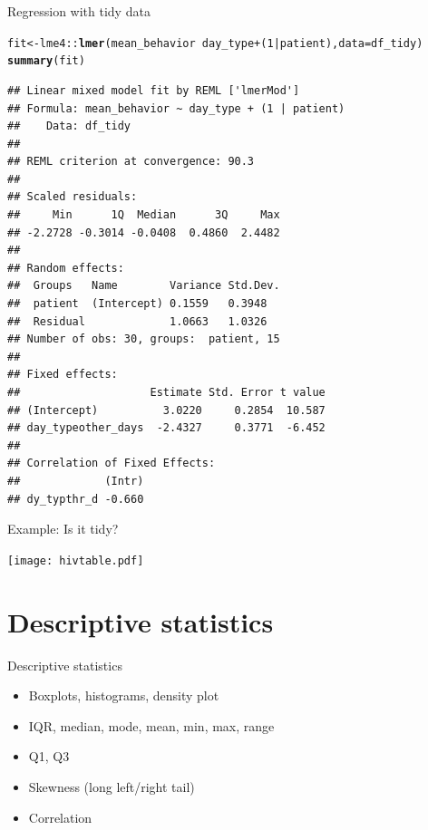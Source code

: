\documentclass[10pt,handout]{beamer}\usepackage[]{graphicx}\usepackage[]{color}
\makeatletter
\newcommand{\hlnum}[1]{\textcolor[rgb]{0.686,0.059,0.569}{#1}}%
\newcommand{\hlopt}[1]{\textcolor[rgb]{0,0,0}{#1}}%
\newcommand{\hlstd}[1]{\textcolor[rgb]{0.345,0.345,0.345}{#1}}%
\newcommand{\hlkwb}[1]{\textcolor[rgb]{0.69,0.353,0.396}{#1}}%
\newcommand{\hlkwc}[1]{\textcolor[rgb]{0.333,0.667,0.333}{#1}}%
\newcommand{\hlkwd}[1]{\textcolor[rgb]{0.737,0.353,0.396}{\textbf{#1}}}%
\newenvironment{kframe}{%
 \def\at@end@of@kframe{}%
 \ifinner\ifhmode%
  \def\at@end@of@kframe{\end{minipage}}%
  \begin{minipage}{\columnwidth}%
 \fi\fi%
 \def\FrameCommand##1{\hskip\@totalleftmargin \hskip-\fboxsep
 \colorbox{shadecolor}{##1}\hskip-\fboxsep
     \hskip-\linewidth \hskip-\@totalleftmargin \hskip\columnwidth}%
 \MakeFramed {\advance\hsize-\width
   \@totalleftmargin\z@ \linewidth\hsize
   \@setminipage}}%
 {\par\unskip\endMakeFramed%
 \at@end@of@kframe}
\newenvironment{knitrout}{}{} %
\makeatother
\begin{document}
\begin{frame}[fragile]{Regression with tidy data}
	
	
\begin{knitrout}\tiny
{}\color{fgcolor}\begin{kframe}
\begin{alltt}
\hlstd{fit} \hlkwb{<-} \hlstd{lme4}\hlopt{::}\hlkwd{lmer}\hlstd{(mean_behavior} \hlopt{~} \hlstd{day_type} \hlopt{+} \hlstd{(}\hlnum{1}\hlopt{|}\hlstd{patient),} \hlkwc{data} \hlstd{= df_tidy)}
\hlkwd{summary}\hlstd{(fit)}
\end{alltt}
\begin{verbatim}
## Linear mixed model fit by REML ['lmerMod']
## Formula: mean_behavior ~ day_type + (1 | patient)
##    Data: df_tidy
## 
## REML criterion at convergence: 90.3
## 
## Scaled residuals: 
##     Min      1Q  Median      3Q     Max 
## -2.2728 -0.3014 -0.0408  0.4860  2.4482 
## 
## Random effects:
##  Groups   Name        Variance Std.Dev.
##  patient  (Intercept) 0.1559   0.3948  
##  Residual             1.0663   1.0326  
## Number of obs: 30, groups:  patient, 15
## 
## Fixed effects:
##                    Estimate Std. Error t value
## (Intercept)          3.0220     0.2854  10.587
## day_typeother_days  -2.4327     0.3771  -6.452
## 
## Correlation of Fixed Effects:
##             (Intr)
## dy_typthr_d -0.660
\end{verbatim}
\end{kframe}
\end{knitrout}
\end{frame}














\begin{frame}[fragile]{Example: Is it tidy?}
	
	\centering
	\texttt{[image: hivtable.pdf]}
	
	
\end{frame}


\section{Descriptive statistics}


\begin{frame}{Descriptive statistics}
	\begin{itemize}
		\setlength\itemsep{1.5em}
		\item Boxplots, histograms, density plot
		\item IQR, median, mode, mean, min, max, range
		\item Q1, Q3
		\item Skewness (long left/right tail)
		\item Correlation
	\end{itemize}
\end{frame}
\end{document}
